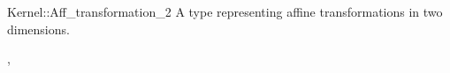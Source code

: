 \begin{ccRefConcept}{Kernel::Aff_transformation_2}
\ccDefinition
A type representing affine transformations in two dimensions.

\ccRefines
{},

\ccSeeAlso
{}
\end{ccRefConcept}
